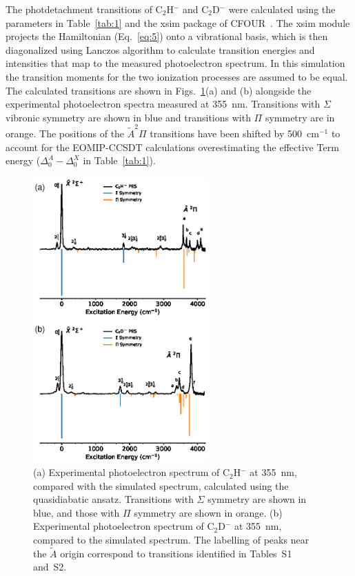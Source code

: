\documentclass[aip,graphicx]{revtex4-1}
\begin{document}
The photdetachment transitions of C$_2$H$^-$ and C$_2$D$^-$ were calculated using the parameters in Table~\ref{tab:1} and the xsim package of CFOUR~\cite{dev20}. The xsim module projects the Hamiltonian (Eq.~\ref{eq:5}) onto a vibrational basis, which is then diagonalized using Lanczos algorithm to calculate transition energies and intensities that map to the measured photoelectron spectrum. In this simulation the transition moments for the two ionization processes are assumed to be equal. The calculated transitions are shown in Figs.~\ref{fig:3}(a) and (b) alongside the experimental photoelectron spectra measured at 355~nm. Transitions with $\Sigma$ vibronic symmetry are shown in blue and transitions with $\Pi$ symmetry are in orange. The positions of the $\tilde{A} ^2\Pi$ transitions have been shifted by 500~cm$^{-1}$ to account for the EOMIP-CCSDT calculations overestimating the effective Term energy ($\Delta^A_0-\Delta^X_0$ in Table~\ref{tab:1}).

\begin{figure}[th!]
	\includegraphics[width=0.6\textwidth]{figures/Fig3}
	\caption{(a) Experimental photoelectron spectrum of C$_2$H$^-$ at 355~nm, compared with the simulated spectrum, calculated using the quasidiabatic ansatz. Transitions with $\Sigma$ symmetry are shown in blue, and those with $\Pi$ symmetry are shown in orange. (b) Experimental photoelectron spectrum of C$_2$D$^-$ at 355~nm, compared to the simulated spectrum. The labelling of peaks near the $\tilde{A}$ origin correspond to transitions identified in Tables~S1 and~S2.}
	\label{fig:3}
\end{figure}
\end{document}
